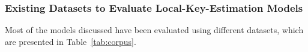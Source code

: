 

\subsubsection{Existing Datasets to Evaluate Local-Key-Estimation Models}

Most of the models discussed have been evaluated using different datasets, which are presented in Table~\ref{tab:corpus}.

